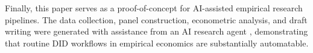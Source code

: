 \documentclass[12pt]{article}
\begin{document}
Finally, this paper serves as a proof-of-concept for AI-assisted empirical
research pipelines. The data collection, panel construction, econometric
analysis, and draft writing were generated with assistance from an AI research
agent \citep{hler2026,airesearcher2025}, demonstrating that routine DID
workflows in empirical economics are substantially automatable.

\bigskip


\end{document}
